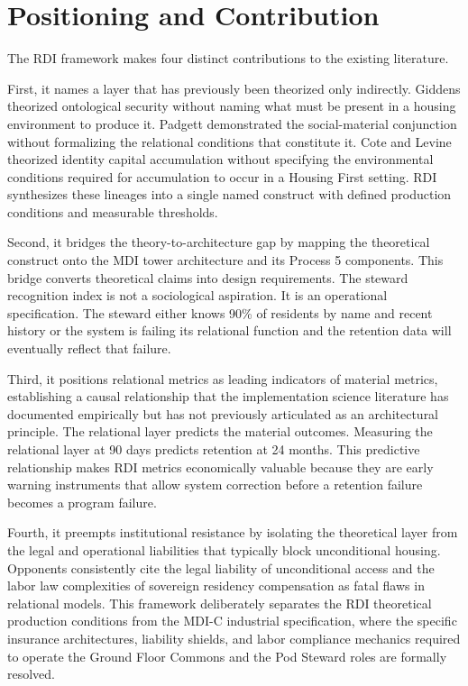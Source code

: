 \documentclass[12pt, letterpaper]{article}
\begin{document}
\clearpage
\section{Positioning and Contribution}

The RDI framework makes four distinct contributions to the existing literature.

First, it names a layer that has previously been theorized only indirectly. Giddens theorized ontological security without naming what must be present in a housing environment to produce it. Padgett demonstrated the social-material conjunction without formalizing the relational conditions that constitute it. Cote and Levine theorized identity capital accumulation without specifying the environmental conditions required for accumulation to occur in a Housing First setting. RDI synthesizes these lineages into a single named construct with defined production conditions and measurable thresholds.

Second, it bridges the theory-to-architecture gap by mapping the theoretical construct onto the MDI tower architecture and its Process 5 components. This bridge converts theoretical claims into design requirements. The steward recognition index is not a sociological aspiration. It is an operational specification. The steward either knows 90\% of residents by name and recent history or the system is failing its relational function and the retention data will eventually reflect that failure.

Third, it positions relational metrics as leading indicators of material metrics, establishing a causal relationship that the implementation science literature has documented empirically but has not previously articulated as an architectural principle. The relational layer predicts the material outcomes. Measuring the relational layer at 90 days predicts retention at 24 months. This predictive relationship makes RDI metrics economically valuable because they are early warning instruments that allow system correction before a retention failure becomes a program failure.

Fourth, it preempts institutional resistance by isolating the theoretical layer from the legal and operational liabilities that typically block unconditional housing. Opponents consistently cite the legal liability of unconditional access and the labor law complexities of sovereign residency compensation as fatal flaws in relational models. This framework deliberately separates the RDI theoretical production conditions from the MDI-C industrial specification, where the specific insurance architectures, liability shields, and labor compliance mechanics required to operate the Ground Floor Commons and the Pod Steward roles are formally resolved.
\end{document}

